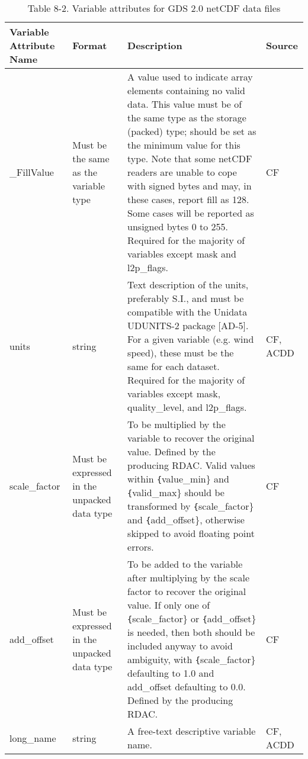 \begin{longtable}{|p{}|p{}|p{}|p{}|}
\caption{Table 8-2. Variable attributes for GDS 2.0 netCDF data files}
\label{tab:variable-attributes} \\ 
\hline \endhead
\hline \endfoot
\rowcolor{lightgray} \textbf{Variable Attribute Name} & \textbf{Format} & \textbf{Description} & \textbf{Source} \\ \hline
\rowcolor{LightCyan} \_FillValue & Must be the same as the variable type & A value used to indicate array elements containing no valid data. This value must be of the same type as the storage (packed) type; should be set as the minimum value for this type. Note that some netCDF readers are unable to cope with signed bytes and may, in these cases, report fill as 128. Some cases will be reported as unsigned bytes 0 to 255. Required for the majority of variables except mask and l2p\_flags. & CF \\ \hline

\rowcolor{LightCyan} units & string & Text description of the units, preferably S.I., and must be compatible with the Unidata UDUNITS-2 package [AD-5]. For a given variable (e.g. wind speed), these must be the same for each dataset. Required for the majority of variables except mask, quality\_level, and l2p\_flags. & CF, ACDD \\ \hline

\rowcolor{LightCyan} scale\_factor & Must be expressed in the unpacked data type & To be multiplied by the variable to recover the
original value. Defined by the producing
RDAC. Valid values within \texttt\{value\_min\} and
\texttt\{valid\_max\} should be transformed by
\texttt\{scale\_factor\} and \texttt\{add\_offset\}, otherwise
skipped to avoid floating point errors. & CF \\ \hline

\rowcolor{LightCyan} add\_offset & Must be expressed in the unpacked data type & To be added to the variable after multiplying by the scale factor to recover the original value. If only one of \texttt\{scale\_factor\} or \texttt\{add\_offset\} is needed, then both should be included anyway to avoid ambiguity, with \texttt\{scale\_factor\} defaulting to 1.0 and add\_offset defaulting to 0.0. Defined by the producing RDAC. & CF \\ \hline

\rowcolor{LightCyan} long\_name & string & A free-text descriptive variable name. & CF, ACDD \\ \hline


\end{longtable}
